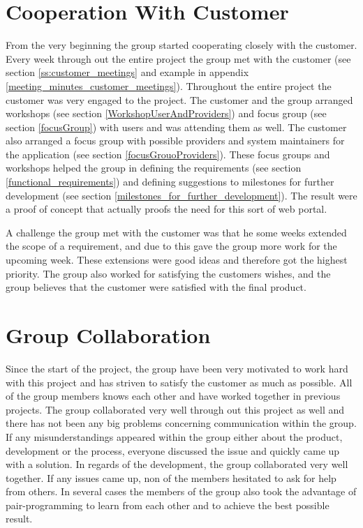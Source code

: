 \section{Cooperation With Customer}
From the very beginning the group started cooperating closely with the customer. Every week through out the entire project the group met with the customer (see section \ref{ss:customer_meetings} and example in appendix \ref{meeting_minutes_customer_meetings}). Throughout the entire project the customer was very engaged to the project. The customer and the group arranged workshops (see section \ref{WorkshopUserAndProviders}) and focus group (see section \ref{focusGroup}) with users and was attending them as well. The customer also arranged a focus group with possible providers and system maintainers for the application (see section \ref{focusGrouoProviders}). 
These focus groups and workshops helped the group in defining the requirements (see section \ref{functional_requirements}) and defining suggestions to milestones for further development (see section \ref{milestones_for_further_development}). The result were a proof of concept that actually proofs the need for this sort of web portal.

A challenge the group met with the customer was that he some weeks extended the scope of a requirement, and due to this gave the group more work for the upcoming week. These extensions were good ideas and therefore got the highest priority. The group also worked for satisfying the customers wishes, and the group believes that the customer were satisfied with the final product.


\section{Group Collaboration}
Since the start of the project, the group have been very motivated to work hard with this project and has striven to satisfy the customer as much as possible. All of the group members knows each other and have worked together in previous projects. The group collaborated very well through out this project as well and there has not been any big problems concerning communication within the group. If any misunderstandings appeared within the group either about the product, development or the process, everyone discussed the issue and quickly came up with a solution. In regards of the development, the group collaborated very well together. If any issues came up, non of the members hesitated to ask for help from others. In several cases the members of the group also took the advantage of pair-programming to learn from each other and to achieve the best possible result.

